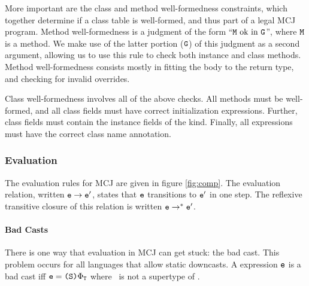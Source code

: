 \documentclass{acm-sigplan}
\begin{document}
More important are the class and method well-formedness constraints,
which together determine if a class table is well-formed, and thus
part of a legal MCJ program.  Method well-formedness is a
judgment of the form ``$\mbox {\tt M} \mbox{\ ok in}\ \mathtt{{G}}$'', where $\mbox {\tt M}$ is a method.  We make
use of the latter portion ($\mathtt{{G}}$) of this judgment as a second argument,
allowing us to use this rule to check both instance and class methods.
Method well-formedness consists mostly in fitting the body to the
return type, and checking for invalid overrides.

Class well-formedness involves all of the above checks.
All methods must be well-formed, and all class fields must
have correct initialization expressions.  Further, class fields
must contain the instance fields of the kind.  Finally, all
{} expressions must have the correct class name annotation.


\figExprty

\figWF

\subsubsection{Evaluation}

The evaluation rules for MCJ are given in figure \ref{fig:comp}.
The evaluation relation, written ${\mbox {\tt e}} \rightarrow \mbox {\tt e$'$}$, states that $\mbox {\tt e}$
transitions to $\mbox {\tt e$'$}$ in one step.  The reflexive transitive closure of
this relation is written $\mbox {\tt e} \rightarrow^* \mbox {\tt e$'$}$.

%


\paragraph{Bad Casts}
There is one way that evaluation in MCJ can get stuck: the bad cast.
This problem occurs for all languages that allow static downcasts.  A
expression $\mbox {\tt e}$ is a bad cast iff $\mbox {\tt e} = \mbox{\tt \mbox{\tt (}\mbox {\tt S}\mbox{\tt )}{\ensuremath {\Phi_{\mathtt{{T}}}}}}$ where
\SSS\ is not a supertype of \T.
\end{document}
